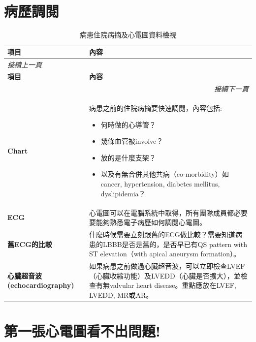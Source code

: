 \documentclass[fleqn,10pt,
paperheight=16cm, paperwidth=12cm,
includehead,%
nomarginpar,%
textwidth=10cm,%
headheight=25pt,%
]{wlscirep}
\begin{document}
\section{病歷調閱}
\begin{longtable}{p{4cm} p{9cm}}
\caption{病患住院病摘及心電圖資料檢視}\\
\hline
\textbf{項目} & \textbf{內容} \\
\hline
\endfirsthead
\multicolumn{2}{l}{\textit{接續上一頁}} \\
\hline
\textbf{項目} & \textbf{內容} \\
\hline
\endhead
\hline \multicolumn{2}{r}{\textit{接續下一頁}} \\
\endfoot
\endlastfoot

\textbf{Chart} & 
病患之前的住院病摘要快速調閱，內容包括:
\begin{itemize}
    \item 何時做的心導管？
    \item 幾條血管被involve？
    \item 放的是什麼支架？
    \item 以及有無合併其他共病（co-morbidity）如cancer, hypertension, diabetes mellitus, dyslipidemia？
\end{itemize}
\\ \hline

\textbf{ECG} & 心電圖可以在電腦系統中取得，所有團隊成員都必要要能夠熟悉電子病歷如何調閱心電圖。\\ \hline

\textbf{舊ECG的比較} & 什麼時候需要立刻跟舊的ECG做比較？需要知道病患的LBBB是否是舊的，是否早已有QS pattern with ST elevation（with apical aneurysm formation）。 \\ \hline

\textbf{心臟超音波 (echocardiography)} & 如果病患之前做過心臟超音波，可以立即檢查LVEF（心臟收縮功能）及LVEDD（心臟是否擴大），並檢查有無valvular heart disease。重點應放在LVEF, LVEDD, MR或AR。 \\ \hline

\end{longtable}

\section{第一張心電圖看不出問題!}
\end{document}
